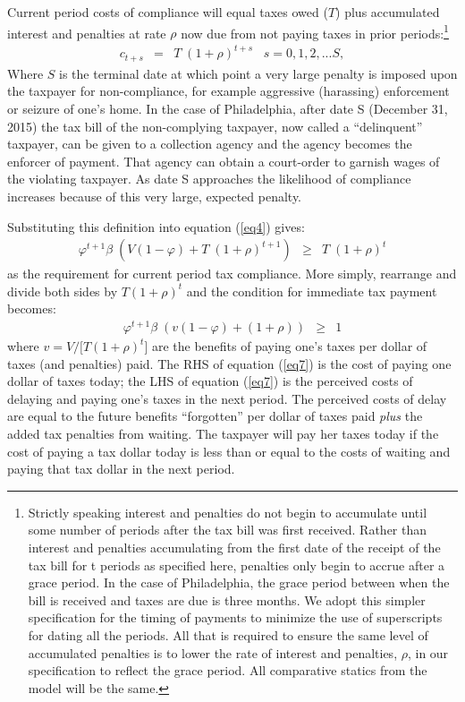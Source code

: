 \documentclass[12pt]{article}
\begin{document}
Current period costs of compliance will equal taxes owed ($T$) plus
accumulated interest and penalties at rate $\rho$ now due from not
paying taxes in prior periods:\footnote{Strictly speaking interest and
  penalties do not begin to accumulate until some number of periods
  after the tax bill was first received. Rather than interest and
  penalties accumulating from the first date of the receipt of the tax
  bill for t periods as specified here, penalties only begin to accrue
  after a grace period.  In the case of Philadelphia, the grace period
  between when the bill is received and taxes are due is three months.
  We adopt this simpler specification for the timing of payments to
  minimize the use of superscripts for dating all the periods. All
  that is required to ensure the same level of accumulated penalties
  is to lower the rate of interest and penalties, $\rho$, in our
  specification to reflect the grace period. All comparative statics
  from the model will be the same. }
\begin{eqnarray}\label{eq5}
c_{t+s} &=& T \; (1 + \rho)^{t+s} \; \; \; s=0,1,2,...S,
\end{eqnarray}
Where $S$ is the terminal date at which point a very large penalty is
imposed upon the taxpayer for non-compliance, for example aggressive
(harassing) enforcement or seizure of one's home. In the case of
Philadelphia, after date S (December 31, 2015) the tax bill of the
non-complying taxpayer, now called a ``delinquent'' taxpayer, can be given to a collection agency and the
agency becomes the enforcer of payment. That agency can obtain a
court-order to garnish wages of the violating taxpayer. As date S
approaches the likelihood of compliance increases because of this very
large, expected penalty.

Substituting this definition into equation (\ref{eq4}) gives:  
\begin{eqnarray}\label{eq6}
\varphi^{t+1} \beta \; (V (1-\varphi) + T \; (1 + \rho)^{t+1}) &\ge&
  T \; (1 + \rho)^{t}
\end{eqnarray}
as the requirement for current period tax compliance.  More simply,
rearrange and divide both sides by $T(1 + \rho)^{t}$ and the condition
for immediate tax payment becomes:
\begin{eqnarray}\label{eq7}
\varphi^{t+1} \beta \;  (v (1-\varphi) +  (1 + \rho))  &\ge&   1
\end{eqnarray}
where $v = V/[T(1 + \rho)^{t}$] are the benefits of paying one's taxes
per dollar of taxes (and penalties) paid.  The RHS of equation
(\ref{eq7}) is the cost of paying one dollar of taxes today; the LHS
of equation (\ref{eq7}) is the perceived costs of delaying and paying
one's taxes in the next period.  The perceived costs of delay are
equal to the future benefits ``forgotten'' per dollar of taxes paid
\textit{plus} the added tax penalties from waiting.  The taxpayer will
pay her taxes today if the cost of paying a tax dollar today is less
than or equal to the costs of waiting and paying that tax dollar in
the next period.
\end{document}
